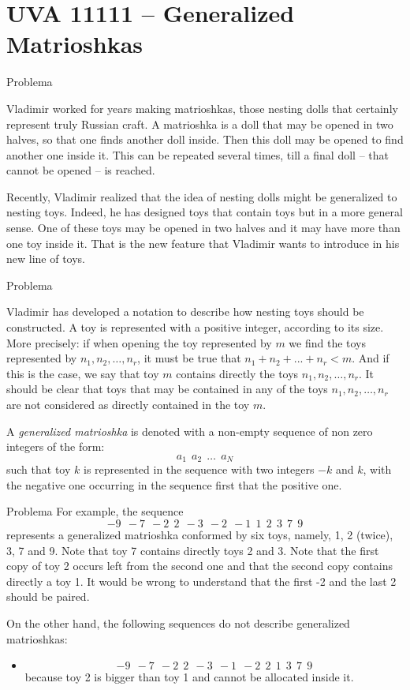 \section{UVA 11111 -- Generalized Matrioshkas}

\begin{frame}[fragile]{Problema}

Vladimir worked for years making matrioshkas, those nesting dolls that certainly represent truly 
Russian craft. A matrioshka is a doll that may be opened in two halves, so that one finds another 
doll inside.  Then this doll may be opened to find another one inside it. This can be repeated 
several times, till a final doll -- that cannot be opened -- is reached.

Recently, Vladimir realized that the idea of nesting dolls might be generalized to nesting toys.
Indeed, he has designed toys that contain toys but in a more general sense. One of these toys may
be opened in two halves and it may have more than one toy inside it. That is the new feature that
Vladimir wants to introduce in his new line of toys.
\end{frame}

\begin{frame}[fragile]{Problema}

Vladimir has developed a notation to describe how nesting toys should be constructed. A toy
is represented with a positive integer, according to its size. More precisely: if when opening the 
toy represented by $m$ we find the toys represented by $n_1, n_2, \ldots, n_r$, it must be true 
that $n_1+n_2+. . .+n_r < m$. And if this is the case, we say that toy $m$ contains directly the 
toys $n_1, n_2, \ldots, n_r$. It should be clear that toys that may be contained in any of the toys 
$n_1, n_2, \ldots, n_r$ are not considered as directly contained in the toy $m$.

A \textit{generalized matrioshka} is denoted with a non-empty sequence of non zero integers of the 
form:
\[
a_1\ \ a_2\ \ \ldots\ \ a_N
\]
such that toy $k$ is represented in the sequence with two integers $-k$ and $k$, with the negative 
one occurring in the sequence first that the positive one.

\end{frame}

\begin{frame}[fragile]{Problema}
For example, the sequence
\[
-9\ \ -7\ \ -2\ \ 2\ \ -3\ \ -2\ \ -1\ \ 1\ \ 2\ \ 3\ \ 7\ \ 9
\]
represents a generalized matrioshka conformed by six toys, namely, 1, 2 (twice), 3, 7 and 9. 
Note that toy 7 contains directly toys 2 and 3. Note that the first copy of toy 2 occurs left 
from the second one and that the second copy contains directly a toy 1. It would be wrong to 
understand that the first -2 and the last 2 should be paired.

On the other hand, the following sequences do not describe generalized matrioshkas:
\begin{itemize}
\item
\[
-9\ \ -7\ \ -2\ \ 2\ \ -3\ \ -1\ \ -2\ \ 2\ \ 1\ \ 3\ \ 7\ \ 9
\]
because toy 2 is bigger than toy 1 and cannot be allocated inside it.
\end{itemize}
\end{frame}


